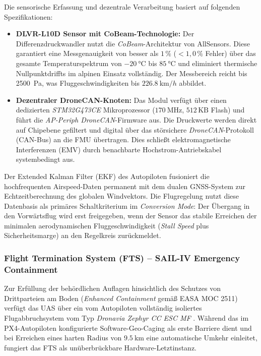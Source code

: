 Die sensorische Erfassung und dezentrale Verarbeitung basiert auf folgenden Spezifikationen:
\begin{itemize}
    \item \textbf{DLVR-L10D Sensor mit CoBeam-Technologie:} Der Differenzdruckwandler nutzt die \textit{CoBeam\texttrademark}-Architektur von AllSensors. Diese garantiert eine Messgenauigkeit von besser als $1\,\%$ ($<1{,}0\,\%$ Fehler) über das 
                                                            gesamte Temperaturspektrum von $\SI{-20}{\celsius}$ bis $\SI{+85}{\celsius}$ und eliminiert thermische Nullpunktdriffts im alpinen Einsatz vollständig. Der Messbereich reicht bis \SI{2500}{\Pa}, 
                                                            was Fluggeschwindigkeiten bis $\SI{226.8}{\km/h}$ abbildet.
    \item \textbf{Dezentraler DroneCAN-Knoten:} Das Modul verfügt über einen dedizierten \textit{STM32G473CE} Mikroprozessor ($\SI{170}{\MHz}$, $512\,\text{KB}$ Flash) und führt die \textit{AP-Periph DroneCAN}-Firmware aus. 
                                                Die Druckwerte werden direkt auf Chipebene gefiltert und digital über das störsichere \textit{DroneCAN}-Protokoll (CAN-Bus) an die FMU übertragen. Dies schließt elektromagnetische Interferenzen (EMV) 
                                                durch benachbarte Hochstrom-Antriebskabel systembedingt aus.
\end{itemize}

Der Extended Kalman Filter (EKF) des Autopiloten fusioniert die hochfrequenten Airspeed-Daten permanent mit dem dualen GNSS-System zur Echtzeitberechnung des globalen Windvektors. Die Flugregelung nutzt diese Datenbasis als primäres 
Schaltkriterium im \textit{Conversion Mode}: Der Übergang in den Vorwärtsflug wird erst freigegeben, wenn der Sensor das stabile Erreichen der minimalen aerodynamischen Fluggeschwindigkeit (\textit{Stall Speed} plus Sicherheitsmarge) 
an den Regelkreis zurückmeldet.

\subsubsection{Flight Termination System (FTS) -- SAIL-IV Emergency Containment}
\label{sec:flight_termination_system}

Zur Erfüllung der behördlichen Auflagen hinsichtlich des Schutzes von Drittparteien am Boden (\textit{Enhanced Containment} gemäß EASA MOC 2511) verfügt das UAS über ein vom Autopiloten vollständig 
isoliertes Flugabbruchsystem vom Typ \textit{Dronavia Zephyr CC ESC MF} \cite{dronavia_zephyr_fts}. Während das im PX4-Autopiloten konfigurierte Software-Geo-Caging als erste Barriere dient und bei Erreichen eines 
harten Radius von $\SI{9.5}{\km}$ eine automatische Umkehr einleitet, fungiert das FTS als unüberbrückbare Hardware-Letztinstanz.

